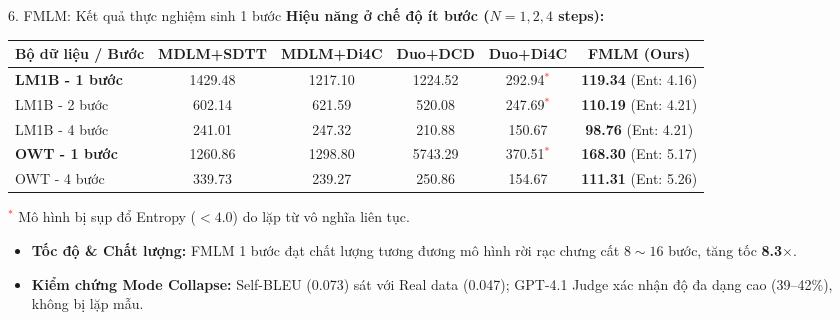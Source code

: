 \begin{frame}{6. FMLM: Kết quả thực nghiệm sinh 1 bước}
    \textbf{Hiệu năng ở chế độ ít bước ($N = 1, 2, 4$ steps):}
    \begin{table}[h]
        \centering
        \footnotesize
        \begin{tabular}{lccccc}
            \toprule
            \textbf{Bộ dữ liệu / Bước} & \textbf{MDLM+SDTT} & \textbf{MDLM+Di4C} & \textbf{Duo+DCD} & \textbf{Duo+Di4C} & \textbf{FMLM (Ours)} \\
            \midrule
            \textbf{LM1B - 1 bước} & 1429.48 & 1217.10 & 1224.52 & 292.94\textcolor{red}{$^*$} & \textbf{119.34} (Ent: 4.16) \\
            LM1B - 2 bước & 602.14 & 621.59 & 520.08 & 247.69\textcolor{red}{$^*$} & \textbf{110.19} (Ent: 4.21) \\
            LM1B - 4 bước & 241.01 & 247.32 & 210.88 & 150.67 & \textbf{98.76} (Ent: 4.21) \\
            \midrule
            \textbf{OWT - 1 bước} & 1260.86 & 1298.80 & 5743.29 & 370.51\textcolor{red}{$^*$} & \textbf{168.30} (Ent: 5.17) \\
            OWT - 4 bước & 339.73 & 239.27 & 250.86 & 154.67 & \textbf{111.31} (Ent: 5.26) \\
            \bottomrule
        \end{tabular}
    \end{table}
    \vspace{-0.2cm}
    {\tiny \textcolor{red}{$^*$} Mô hình bị sụp đổ Entropy ($<4.0$) do lặp từ vô nghĩa liên tục.}

    \begin{itemize}
        \item \textbf{Tốc độ \& Chất lượng:} FMLM 1 bước đạt chất lượng tương đương mô hình rời rạc chưng cất $8 \sim 16$ bước, tăng tốc \textbf{8.3$\times$}.
        \item \textbf{Kiểm chứng Mode Collapse:} Self-BLEU (0.073) sát với Real data (0.047); GPT-4.1 Judge xác nhận độ đa dạng cao (39--42\%), không bị lặp mẫu.
    \end{itemize}
\end{frame}

